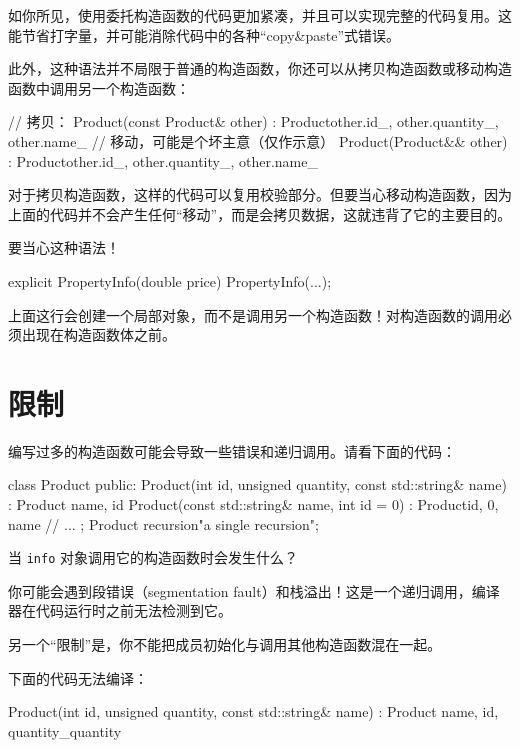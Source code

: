如你所见，使用委托构造函数的代码更加紧凑，并且可以实现完整的代码复用。这能节省打字量，并可能消除代码中的各种“copy\&paste”式错误。

此外，这种语法并不局限于普通的构造函数，你还可以从拷贝构造函数或移动构造函数中调用另一个构造函数：

\begin{codebox}[cpp]
// 拷贝：
Product(const Product& other) : Product{other.id_, other.quantity_, other.name_}
{ }
// 移动，可能是个坏主意（仅作示意）
Product(Product&& other)
: Product{other.id_, other.quantity_, other.name_}
{ }
\end{codebox}

对于拷贝构造函数，这样的代码可以复用校验部分。但要当心移动构造函数，因为上面的代码并不会产生任何“移动”，而是会拷贝数据，这就违背了它的主要目的。

\begin{myWarnBox}
要当心这种语法！

\begin{codebox}[cpp]
explicit PropertyInfo(double price) { PropertyInfo(...); }
\end{codebox}

上面这行会创建一个局部对象，而不是调用另一个构造函数！对构造函数的调用必须出现在构造函数体之前。
\end{myWarnBox}

\section{限制}

编写过多的构造函数可能会导致一些错误和递归调用。请看下面的代码：


\begin{codebox}[cpp]
class Product {
public:
Product(int id, unsigned quantity, const std::string& name)
: Product {name, id} { }
Product(const std::string& name, int id = 0)
: Product{id, 0, name} { }
// ...
};
Product recursion{"a single recursion"};
\end{codebox}

当 \texttt{info} 对象调用它的构造函数时会发生什么？

你可能会遇到段错误（segmentation fault）和栈溢出！这是一个递归调用，编译器在代码运行时之前无法检测到它。

另一个“限制”是，你不能把成员初始化与调用其他构造函数混在一起。

下面的代码无法编译：

\begin{codebox}[cpp]
Product(int id, unsigned quantity, const std::string& name)
: Product {name, id}, quantity_{quantity} { }
\end{codebox}

